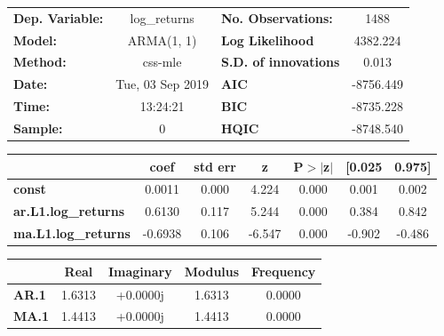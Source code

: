 \begin{center}
\begin{tabular}{lclc}
\toprule
\textbf{Dep. Variable:}     &        log\_returns       & \textbf{  No. Observations:  } &            1488            \\
\textbf{Model:}             &         ARMA(1, 1)        & \textbf{  Log Likelihood     } &          4382.224          \\
\textbf{Method:}            &          css-mle          & \textbf{  S.D. of innovations} &           0.013            \\
\textbf{Date:}              &      Tue, 03 Sep 2019     & \textbf{  AIC                } &         -8756.449          \\
\textbf{Time:}              &          13:24:21         & \textbf{  BIC                } &         -8735.228          \\
\textbf{Sample:}            &             0             & \textbf{  HQIC               } &         -8748.540          \\
\bottomrule
\end{tabular}
\begin{tabular}{lcccccc}
                            & \textbf{coef} & \textbf{std err} & \textbf{z} & \textbf{P$> |$z$|$} & \textbf{[0.025} & \textbf{0.975]}  \\
\midrule
\textbf{const}              &       0.0011  &        0.000     &     4.224  &         0.000        &        0.001    &        0.002     \\
\textbf{ar.L1.log\_returns} &       0.6130  &        0.117     &     5.244  &         0.000        &        0.384    &        0.842     \\
\textbf{ma.L1.log\_returns} &      -0.6938  &        0.106     &    -6.547  &         0.000        &       -0.902    &       -0.486     \\
\bottomrule
\end{tabular}
\begin{tabular}{lcccc}
              & \textbf{            Real} & \textbf{         Imaginary} & \textbf{         Modulus} & \textbf{        Frequency}  \\
\midrule
\textbf{AR.1} &                1.6313     &                +0.0000j     &                1.6313     &                0.0000       \\
\textbf{MA.1} &                1.4413     &                +0.0000j     &                1.4413     &                0.0000       \\
\bottomrule
\end{tabular}
\end{center}

